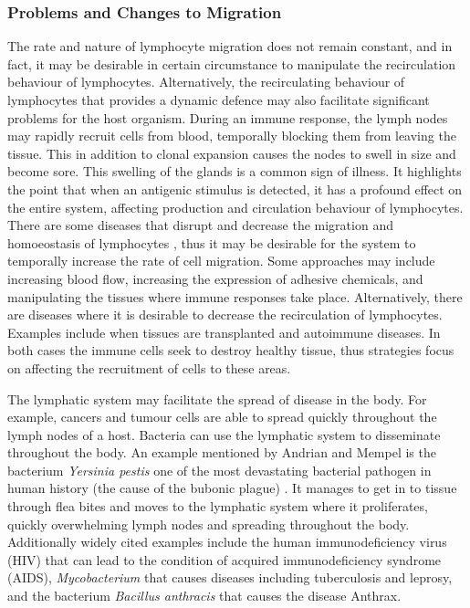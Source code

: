%
%
\subsubsection{Problems and Changes to Migration}
\label{subsubsec:tissues:migration:mobility:problems}
The rate and nature of lymphocyte migration does not remain constant, and in fact, it may be desirable in certain circumstance to manipulate the recirculation behaviour of lymphocytes. Alternatively, the recirculating behaviour of lymphocytes that provides a dynamic defence may also facilitate significant problems for the host organism. During an immune response, the lymph nodes may rapidly recruit cells from blood, temporally blocking them from leaving the tissue. This in addition to clonal expansion causes the nodes to swell in size and become sore. This swelling of the glands is a common sign of illness. It highlights the point that when an antigenic stimulus is detected, it has a profound effect on the entire system, affecting production and circulation behaviour of lymphocytes. There are some diseases that disrupt and decrease the migration and homoeostasis of lymphocytes \cite{Anderson1995}, thus it may be desirable for the system to temporally increase the rate of cell migration. Some approaches may include increasing blood flow, increasing the expression of adhesive chemicals, and manipulating the tissues where immune responses take place. Alternatively, there are diseases where it is desirable to decrease the recirculation of lymphocytes. Examples include when tissues are transplanted and autoimmune diseases. In both cases the immune cells seek to destroy healthy tissue, thus strategies focus on affecting the recruitment of cells to these areas.

The lymphatic system may facilitate the spread of disease in the body. For example, cancers and tumour cells are able to spread quickly throughout the lymph nodes of a host. Bacteria can use the lymphatic system to disseminate throughout the body. An example mentioned by Andrian and Mempel is the bacterium \emph{Yersinia pestis} one of the most devastating bacterial pathogen in human history (the cause of the bubonic plague) \cite{Andrian2003}. It manages to get in to tissue through flea bites and moves to the lymphatic system where it proliferates, quickly overwhelming lymph nodes and spreading throughout the body. Additionally widely cited examples include the human immunodeficiency virus (HIV) that can lead to the condition of acquired immunodeficiency syndrome (AIDS), \emph{Mycobacterium} that causes diseases including tuberculosis and leprosy, and the bacterium \emph{Bacillus anthracis} that causes the disease Anthrax.

